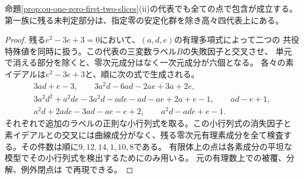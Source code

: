 \begin{corollary}[一零第一族の二つの共役特殊値]
\label{cor:ou-one-zero-first-quadratic-fibres}
命題\ref{prop:ou-one-zero-first-two-slices}(ii)の代表でも全ての点で包含が成立する。
第一族に残る未判定部分は、指定零の安定化群を除き高々四代表上にある。
\end{corollary}
\begin{proof}
残る$e^2-3e+3=0$において、$(a,d,e)$の有理多項式によって二つの
共役特殊値を同時に扱う。この代表の三変数ラベル$B$の失敗因子と交叉させ、
単元で消える部分を除くと、零次元成分はなく一次元成分が六個となる。
各々の素イデアルは$e^2-3e+3$と、順に次の式で生成される。
\[
\begin{gathered}
 3ad+e-3,\qquad
 3a^2d-6ad-2ae+3a+2e,\\
 3a^2d^2+a^2de-3a^2d-ade-ad-ae+2a+e-1,\qquad ad-e+1,\\
 a^2d+2ade-3ad-ae-e+2,\qquad a^2d-ade+e-1 .
\end{gathered}
\]
それぞれで追加のラベルの正則な小行列式を取る。この小行列式の消失因子と
素イデアルとの交叉には曲線成分がなく、残る零次元有理素成分を全て検査する。その件数は順に$9,12,14,1,10,8$である。
有限体上の点は各素成分の平坦な模型でその小行列式を検出するためにのみ用いる。
元の有理数上での被覆、分解、例外閉点は
で再現できる。
\end{proof}

